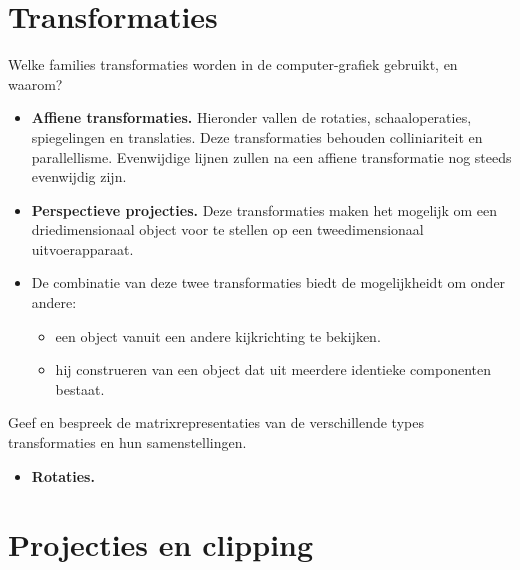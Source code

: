 \documentclass{report}
\begin{document}
\section{Transformaties}
\begin{enumerate}
	\vraag
	{
		Welke families transformaties worden in de computer-grafiek gebruikt, en waarom?
	}
	{
		\begin{itemize}
			\item \textbf{Affiene transformaties.} Hieronder vallen de rotaties, schaaloperaties, spiegelingen en translaties. Deze transformaties behouden colliniariteit en parallellisme. Evenwijdige lijnen zullen na een affiene transformatie nog steeds evenwijdig zijn. 
			      			
			\item \textbf{Perspectieve projecties.} Deze transformaties maken het mogelijk om een driedimensionaal object voor te stellen op een tweedimensionaal uitvoerapparaat.
			      			
			\item De combinatie van deze twee transformaties biedt de mogelijkheidt om onder andere:
			      \begin{itemize}
			      	\item een object vanuit een andere kijkrichting te bekijken.
			      	\item hij construeren van een object dat uit meerdere identieke componenten bestaat. 
			      \end{itemize}
		\end{itemize}	
	}
		
	\vraag 
	{
		Geef en bespreek de matrixrepresentaties van de verschillende types transformaties en hun samenstellingen. 	
	}
	{
		\begin{itemize}
			\item \textbf{Rotaties.} 
		\end{itemize}
	}
\end{enumerate}

\section{Projecties en clipping}
\end{document}
